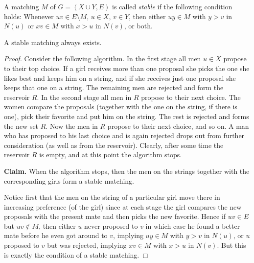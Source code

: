 \begin{definition}
  \label{ch38definition2}
A matching $M$ of $G = (X \cup Y, E)$ is called \textit{stable} if the following condition holds:
Whenever $uv \in E \setminus M$, $u \in X$, $v \in Y$, then either $uy \in M$ with
$y > v$ in $N(u)$ or $xv \in M$ with $x > u$ in $N(v)$, or both.
\end{definition}


\begin{lemma}
  \label{ch38lemma2}
  A stable matching always exists.
\end{lemma}
\begin{proof}
Consider the following algorithm. In the first stage all men $u \in X$ propose to their top choice.
If a girl receives more than one proposal she picks the one she likes best and keeps him on a
string, and if she receives just one proposal she keeps that one on a string. The remaining men
are rejected and form the reservoir $R$. In the second stage all men in $R$ propose to their next
choice. The women compare the proposals (together with the one on the string, if there is one),
pick their favorite and put him on the string. The rest is rejected and forms the new set $R$.
Now the men in $R$ propose to their next choice, and so on. A man who has proposed to his last
choice and is again rejected drops out from further consideration (as well as from the reservoir).
Clearly, after some time the reservoir $R$ is empty, and at this point the algorithm stops.

\textbf{Claim.} When the algorithm stops, then the men on the strings together with the
corresponding girls form a stable matching.

Notice first that the men on the string of a particular girl move there in increasing
preference (of the girl) since at each stage the girl compares the new proposals with the
present mate and then picks the new favorite. Hence if $uv \in E$ but $uv \notin M$, then
either $u$ never proposed to $v$ in which case he found a better mate before he even got
around to $v$, implying $uy \in M$ with $y > v$ in $N(u)$, or $u$ proposed to $v$ but was
rejected, implying $xv \in M$ with $x > u$ in $N(v)$. But this is exactly the condition of a
stable matching.
\end{proof}


